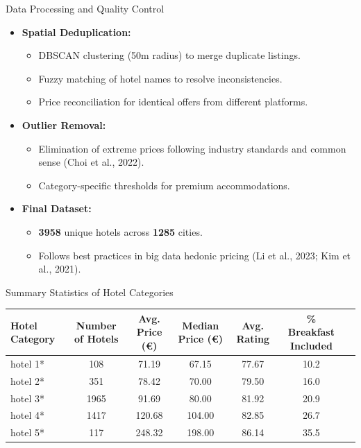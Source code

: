 \documentclass{beamer}
\begin{document}
\begin{frame}{Data Processing and Quality Control}
\begin{itemize}
    \item \textbf{Spatial Deduplication:}  
    \begin{itemize}
        \item DBSCAN clustering (50m radius) to merge duplicate listings.
        \item Fuzzy matching of hotel names to resolve inconsistencies.
        \item Price reconciliation for identical offers from different platforms.
    \end{itemize}

    \item \textbf{Outlier Removal:}  
    \begin{itemize}
        \item Elimination of extreme prices following industry standards and common sense (Choi et al., 2022).
        \item Category-specific thresholds for premium accommodations.
    \end{itemize}

    \item \textbf{Final Dataset:}  
    \begin{itemize}
        \item \textbf{3958} unique hotels across \textbf{1285} cities.
        \item Follows best practices in big data hedonic pricing (Li et al., 2023; Kim et al., 2021).
    \end{itemize}
\end{itemize}
\end{frame}


\begin{frame}{Summary Statistics of Hotel Categories}
\centering
\small
\begin{tabular}{lcccccc}
    \toprule
    \textbf{Hotel Category} & \textbf{Number of Hotels} & \textbf{Avg. Price (€)} & \textbf{Median Price (€)} & \textbf{Avg. Rating} & \textbf{\% Breakfast Included} \\
    \midrule
    hotel 1* & 108  & 71.19  & 67.15  & 77.67  & 10.2  \\
    hotel 2* & 351  & 78.42  & 70.00  & 79.50  & 16.0  \\
    hotel 3* & 1965 & 91.69  & 80.00  & 81.92  & 20.9  \\
    hotel 4* & 1417 & 120.68 & 104.00 & 82.85  & 26.7  \\
    hotel 5* & 117  & 248.32 & 198.00 & 86.14  & 35.5  \\
    \bottomrule
\end{tabular}
\end{frame}
\end{document}
